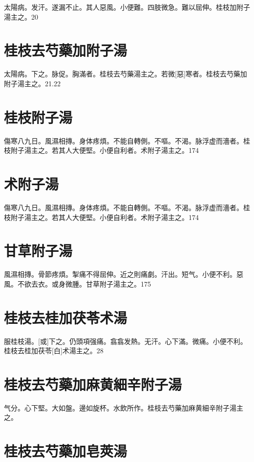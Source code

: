 \documentclass[12pt,oneside,UTF8,b5paper]{ctexbook}她她她她她她她
\begin{document}
太陽病。发汗。遂漏不止。其人惡風。小便難。四肢微急。難以屈伸。桂枝加附子湯主之。20

\section{桂枝去芍藥加附子湯}

太陽病。下之。脉促。胸滿者。桂枝去芍藥湯主之。若微[惡]寒者。桂枝去芍藥加附子湯主之。21.22

\section{桂枝附子湯}

傷寒八九日。風濕相摶。身体疼煩。不能自轉側。不嘔。不渴。脉浮虚而濇者。桂枝附子湯主之。若其人大便堅。小便自利者。术附子湯主之。174

\section{术附子湯}

傷寒八九日。風濕相摶。身体疼煩。不能自轉側。不嘔。不渴。脉浮虚而濇者。桂枝附子湯主之。若其人大便堅。小便自利者。术附子湯主之。174

\section{甘草附子湯}

風濕相摶。骨節疼煩。掣痛不得屈伸。近之則痛劇。汗出。短气。小便不利。惡風。不欲去衣。或身微腫。甘草附子湯主之。175

\section{桂枝去桂加茯苓术湯}

服桂枝湯。[或]下之。仍頭項强痛。翕翕发熱。无汗。心下滿。微痛。小便不利。桂枝去桂加茯苓[白]术湯主之。28

\section{桂枝去芍藥加麻黄細辛附子湯}

气分。心下堅。大如盤。邊如旋杯。水飲所作。桂枝去芍藥加麻黄細辛附子湯主之。

\section{桂枝去芍藥加皂莢湯}
\end{document}
